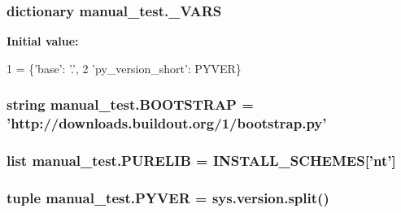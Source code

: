 \subsubsection[{\+\_\+\+V\+A\+R\+S}]{\setlength{\rightskip}{0pt plus 5cm}dictionary manual\+\_\+test.\+\_\+\+V\+A\+R\+S}\label{namespacemanual__test_af7bff7bfba8c3bc48443f7bdb3777b6e}
{\bfseries Initial value\+:}
\begin{DoxyCode}
1 = \{\textcolor{stringliteral}{'base'}: \textcolor{stringliteral}{'.'},
2          \textcolor{stringliteral}{'py\_version\_short'}: PYVER\}
\end{DoxyCode}
\hypertarget{namespacemanual__test_abd3feaea31bfb042e85d714c64e13067}{}
\subsubsection[{B\+O\+O\+T\+S\+T\+R\+A\+P}]{\setlength{\rightskip}{0pt plus 5cm}string manual\+\_\+test.\+B\+O\+O\+T\+S\+T\+R\+A\+P = 'http\+://downloads.\+buildout.\+org/1/bootstrap.\+py'}\label{namespacemanual__test_abd3feaea31bfb042e85d714c64e13067}
\hypertarget{namespacemanual__test_a41aae3a24930c8def6a16e229caf9e68}{}
\subsubsection[{P\+U\+R\+E\+L\+I\+B}]{\setlength{\rightskip}{0pt plus 5cm}list manual\+\_\+test.\+P\+U\+R\+E\+L\+I\+B = I\+N\+S\+T\+A\+L\+L\+\_\+\+S\+C\+H\+E\+M\+E\+S\mbox{[}'nt'\mbox{]}}\label{namespacemanual__test_a41aae3a24930c8def6a16e229caf9e68}
\hypertarget{namespacemanual__test_a76e8acbfa8f2cb2b4e4813dfe3ec0f6a}{}
\subsubsection[{P\+Y\+V\+E\+R}]{\setlength{\rightskip}{0pt plus 5cm}tuple manual\+\_\+test.\+P\+Y\+V\+E\+R = sys.\+version.\+split()}\label{namespacemanual__test_a76e8acbfa8f2cb2b4e4813dfe3ec0f6a}
\hypertarget{namespacemanual__test_a90a129b17e1a45d7248fe9225291e3be}{}
